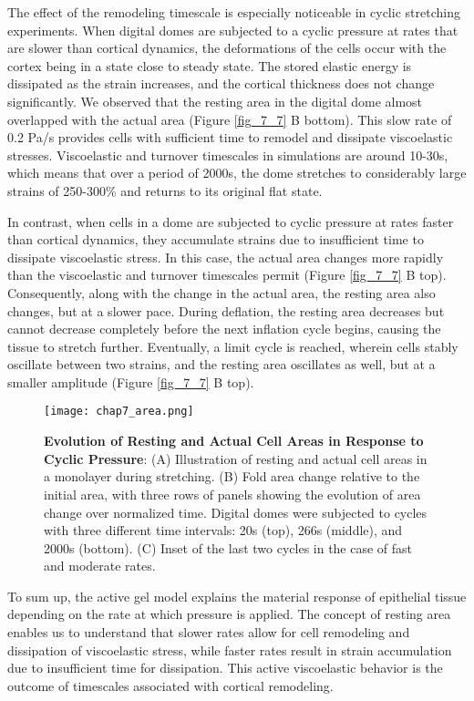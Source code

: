 The effect of the remodeling timescale is especially noticeable in cyclic stretching experiments. When digital domes are subjected to a cyclic pressure at rates that are slower than cortical dynamics, the deformations of the cells occur with the cortex being in a state close to steady state. The stored elastic energy is dissipated as the strain increases, and the cortical thickness does not change significantly. We observed that the resting area in the digital dome almost overlapped with the actual area (Figure \ref{fig_7_7} B bottom). This slow rate of 0.2 Pa/s provides cells with sufficient time to remodel and dissipate viscoelastic stresses. Viscoelastic and turnover timescales in simulations are around 10-30s, which means that over a period of 2000s, the dome stretches to considerably large strains of 250-300\% and returns to its original flat state.

In contrast, when cells in a dome are subjected to cyclic pressure at rates faster than cortical dynamics, they accumulate strains due to insufficient time to dissipate viscoelastic stress. In this case, the actual area changes more rapidly than the viscoelastic and turnover timescales permit (Figure \ref{fig_7_7} B top). Consequently, along with the change in the actual area, the resting area also changes, but at a slower pace. During deflation, the resting area decreases but cannot decrease completely before the next inflation cycle begins, causing the tissue to stretch further. Eventually, a limit cycle is reached, wherein cells stably oscillate between two strains, and the resting area oscillates as well, but at a smaller amplitude (Figure \ref{fig_7_7} B top).


\begin{figure}
	\centering
	\texttt{[image: chap7\_area.png]}
	\caption{\label{fig_7_8} \textbf{Evolution of Resting and Actual Cell Areas in Response to Cyclic Pressure}: (A) Illustration of resting and actual cell areas in a monolayer during stretching. (B) Fold area change relative to the initial area, with three rows of panels showing the evolution of area change over normalized time. Digital domes were subjected to cycles with three different time intervals: 20s (top), 266s (middle), and 2000s (bottom). (C) Inset of the last two cycles in the case of fast and moderate rates.
	}
\end{figure}

To sum up, the active gel model explains the material response of epithelial tissue depending on the rate at which pressure is applied. The concept of resting area enables us to understand that slower rates allow for cell remodeling and dissipation of viscoelastic stress, while faster rates result in strain accumulation due to insufficient time for dissipation. This active viscoelastic behavior is the outcome of timescales associated with cortical remodeling.

